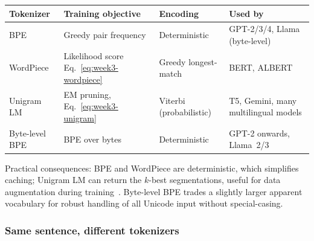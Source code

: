 \begin{center}
\begin{tabular}{|p{2.5cm}|p{3.4cm}|p{3.0cm}|p{3.8cm}|}
\hline
Tokenizer & Training objective & Encoding & Used by \\
\hline
BPE              & Greedy pair frequency            & Deterministic
                   & GPT-2/3/4, Llama (byte-level) \\
WordPiece        & Likelihood score Eq.~\eqref{eq:week3-wordpiece}  & Greedy longest-match
                   & BERT, ALBERT \\
Unigram LM       & EM pruning, Eq.~\eqref{eq:week3-unigram}         & Viterbi (probabilistic)
                   & T5, Gemini, many multilingual models \\
Byte-level BPE   & BPE over bytes                   & Deterministic
                   & GPT-2 onwards, Llama~2/3 \\
\hline
\end{tabular}
\end{center}

Practical consequences: BPE and WordPiece are deterministic, which
simplifies caching; Unigram LM can return the $k$-best segmentations,
useful for data augmentation during training~\citep{kudo2018unigram}.
Byte-level BPE trades a slightly larger apparent vocabulary for robust
handling of all Unicode input without special-casing.

\subsubsection{Same sentence, different tokenizers}

